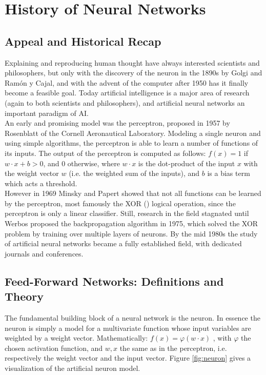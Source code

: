 \documentclass[12pt,oneside]{CUNY_CS_PhD}
\begin{document}
\tableofcontents

\mainmatter

\chapter{History of Neural Networks}
\section{Appeal and Historical Recap}
Explaining and reproducing human thought have always interested scientists and philosophers, but only with the discovery of the neuron in the 1890s by Golgi and Ram\'{o}n y Cajal, and with the advent of the computer after 1950 has it finally become a feasible goal. Today artificial intelligence is a major area of research (again to both scientists and philosophers), and artificial neural networks an important paradigm of AI.\\
An early and promising model was the perceptron, proposed in 1957 by Rosenblatt \cite{rosenblatt_perceptron_1957} of the Cornell Aeronautical Laboratory. Modeling a single neuron and using simple algorithms, the perceptron is able to learn a number of functions of its inputs. The output of the perceptron is computed as follows: $f(x) = 1$ if $w \cdot x + b>0$, and $0$ otherwise, where $w \cdot x$ is the dot-product of the input $x$ with the weight vector $w$ (i.e. the weighted sum of the inputs), and $b$ is a bias term which acts a threshold.\\
However in 1969 Minsky and Papert \cite{minsky_perceptrons_1969} showed that not all functions can be learned by the perceptron, most famously the XOR () logical operation, since the perceptron is only a linear classifier. Still, research in the field stagnated until Werbos proposed the backpropagation algorithm in 1975, which solved the XOR problem by training over multiple layers of neurons. By the mid 1980s the study of artificial neural networks became a fully established field, with dedicated journals and conferences.

\section{Feed-Forward Networks: Definitions and Theory}
The fundamental building block of a neural network is the neuron. In essence the neuron is simply a model for a multivariate function whose input variables are weighted by a weight vector. Mathematically: $f(x) = \varphi(w \cdot x)$ , with $\varphi$ the chosen activation function, and $w,x$ the same as in the perceptron, i.e. respectively the weight vector and the input vector. Figure \ref{fig:neuron} gives a visualization of the artificial neuron model.\\
\end{document}
